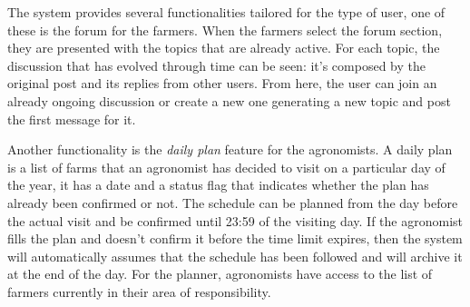 \documentclass[table, 12pt]{article}
\begin{document}
The system provides several functionalities tailored for the type of user, one of these is the forum for the farmers. When the farmers select the forum section, they are presented with the topics that are already active. For each topic, the discussion that has evolved through time can be seen: it's composed by the original post and its replies from other users. From here, the user can join an already ongoing discussion or create a new one generating a new topic and post the first message for it.

Another functionality is the \textit{daily plan} feature for the agronomists.
A daily plan is a list of farms that an agronomist has decided to visit on a particular day of the year, it has a date and a status flag that indicates whether the plan has already been confirmed or not. The schedule can be planned from the day before the actual visit and be confirmed until 23:59 of the visiting day. If the agronomist fills the plan and doesn't confirm it before the time limit expires, then the system will automatically assumes that the schedule has been followed and will archive it at the end of the day. For the planner, agronomists have access to the list of farmers currently in their area of responsibility.
\end{document}
